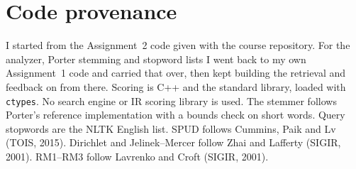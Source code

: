 \documentclass[10pt,a4paper]{article}
\begin{document}
\section{Code provenance}

I started from the Assignment~2 code given with the course repository. For the analyzer, Porter stemming and stopword lists I went back to my own Assignment~1 code and carried that over, then kept building the retrieval and feedback on from there. Scoring is C++ and the standard library, loaded with \texttt{ctypes}. No search engine or IR scoring library is used. The stemmer follows Porter's reference implementation with a bounds check on short words. Query stopwords are the NLTK English list. SPUD follows Cummins, Paik and Lv (TOIS, 2015). Dirichlet and Jelinek--Mercer follow Zhai and Lafferty (SIGIR, 2001). RM1--RM3 follow Lavrenko and Croft (SIGIR, 2001).
 
\end{document}
